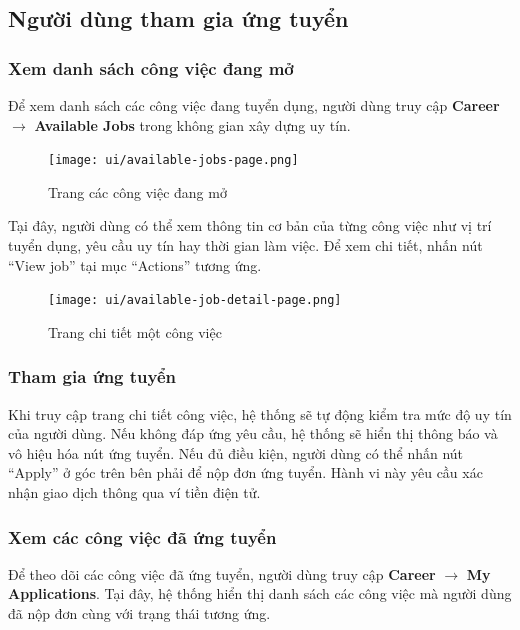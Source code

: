 \subsection{Người dùng tham gia ứng tuyển}

\subsubsection{Xem danh sách công việc đang mở}

Để xem danh sách các công việc đang tuyển dụng, người dùng truy cập \textbf{Career} $\rightarrow$ \textbf{Available Jobs} trong không gian xây dựng uy tín.

\begin{figure}[H]
  \centering
  \texttt{[image: ui/available-jobs-page.png]}
  \caption{Trang các công việc đang mở}
  \label{fig:available-jobs-page}
\end{figure}

Tại đây, người dùng có thể xem thông tin cơ bản của từng công việc như vị trí tuyển dụng, yêu cầu uy tín hay thời gian làm việc. 
Để xem chi tiết, nhấn nút ``View job'' tại mục ``Actions'' tương ứng.

\begin{figure}[H]
  \centering
  \texttt{[image: ui/available-job-detail-page.png]}
  \caption{Trang chi tiết một công việc}
  \label{fig:available-job-detail-page}
\end{figure}

\subsubsection{Tham gia ứng tuyển}

Khi truy cập trang chi tiết công việc, hệ thống sẽ tự động kiểm tra mức độ uy tín của người dùng. Nếu không đáp ứng yêu cầu, hệ thống sẽ hiển thị thông báo và vô hiệu hóa nút ứng tuyển. 
Nếu đủ điều kiện, người dùng có thể nhấn nút ``Apply'' ở góc trên bên phải để nộp đơn ứng tuyển. Hành vi này yêu cầu xác nhận giao dịch thông qua ví tiền điện tử.

\subsubsection{Xem các công việc đã ứng tuyển}

Để theo dõi các công việc đã ứng tuyển, người dùng truy cập \textbf{Career} $\rightarrow$ \textbf{My Applications}. Tại đây, hệ thống hiển thị danh sách các công việc mà người dùng đã nộp đơn cùng với trạng thái tương ứng.


